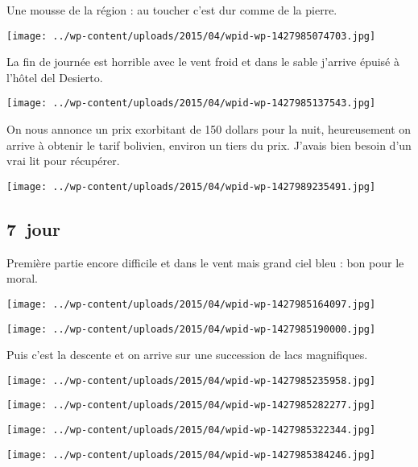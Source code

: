 \pagebreak
 Une mousse de la région : au toucher c'est dur comme de la pierre.
\begin{center} \texttt{[image: ../wp-content/uploads/2015/04/wpid-wp-1427985074703.jpg]} \end{center}

 La fin de journée est horrible avec le vent froid et dans le sable j'arrive épuisé à l'hôtel del Desierto.
\begin{center} \texttt{[image: ../wp-content/uploads/2015/04/wpid-wp-1427985137543.jpg]} \end{center}

  On nous annonce un prix exorbitant de 150 dollars pour la nuit, heureusement on arrive à obtenir le tarif bolivien, environ un tiers du prix. J'avais bien besoin d'un vrai lit pour récupérer.
\begin{center} \texttt{[image: ../wp-content/uploads/2015/04/wpid-wp-1427989235491.jpg]} \end{center}

 \subsection*{7\ieme\ jour} 

 Première partie encore difficile et dans le vent mais grand ciel bleu : bon pour le moral.
\begin{center} \texttt{[image: ../wp-content/uploads/2015/04/wpid-wp-1427985164097.jpg]} \end{center}
\begin{center} \texttt{[image: ../wp-content/uploads/2015/04/wpid-wp-1427985190000.jpg]} \end{center}

  Puis c'est la descente et on arrive sur une succession de lacs magnifiques.
\begin{center} \texttt{[image: ../wp-content/uploads/2015/04/wpid-wp-1427985235958.jpg]} \end{center}
\begin{center} \texttt{[image: ../wp-content/uploads/2015/04/wpid-wp-1427985282277.jpg]} \end{center}
\begin{center} \texttt{[image: ../wp-content/uploads/2015/04/wpid-wp-1427985322344.jpg]} \end{center}
\begin{center} \texttt{[image: ../wp-content/uploads/2015/04/wpid-wp-1427985384246.jpg]} \end{center}

